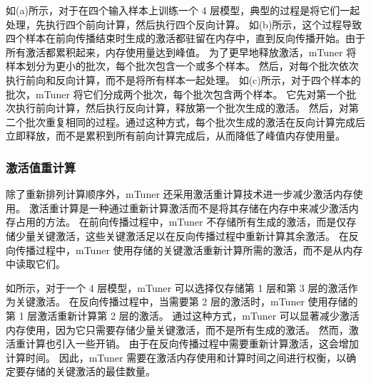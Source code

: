如(a)所示，对于在四个输入样本上训练一个 4 层模型，典型的过程是将它们一起处理，先执行四个前向计算，然后执行四个反向计算。
如(b)所示，这个过程导致四个样本在前向传播结束时生成的激活都驻留在内存中，直到反向传播开始。由于所有激活都累积起来，内存使用量达到峰值。
为了更早地释放激活，mTuner 将样本划分为更小的批次，每个批次包含一个或多个样本。
然后，对每个批次依次执行前向和反向计算，而不是将所有样本一起处理。
如(c)所示，对于四个样本的批次，mTuner 将它们分成两个批次，每个批次包含两个样本。
它先对第一个批次执行前向计算，然后执行反向计算，释放第一个批次生成的激活。
然后，对第二个批次重复相同的过程。通过这种方式，每个批次生成的激活在反向计算完成后立即释放，而不是累积到所有前向计算完成后，从而降低了峰值内存使用量。






\subsubsection{激活值重计算}
除了重新排列计算顺序外，mTuner 还采用激活重计算技术进一步减少激活内存使用。
激活重计算是一种通过重新计算激活而不是将其存储在内存中来减少激活内存占用的方法。
在前向传播过程中，mTuner 不存储所有生成的激活，而是仅存储少量关键激活，这些关键激活足以在反向传播过程中重新计算其余激活。
在反向传播过程中，mTuner 使用存储的关键激活重新计算所需的激活，而不是从内存中读取它们。

如所示，对于一个 4 层模型，mTuner 可以选择仅存储第 1 层和第 3 层的激活作为关键激活。
在反向传播过程中，当需要第 2 层的激活时，mTuner 使用存储的第 1 层激活重新计算第 2 层的激活。
通过这种方式，mTuner 可以显著减少激活内存使用，因为它只需要存储少量关键激活，而不是所有生成的激活。
然而，激活重计算也引入一些开销。
由于在反向传播过程中需要重新计算激活，这会增加计算时间。
因此，mTuner 需要在激活内存使用和计算时间之间进行权衡，以确定要存储的关键激活的最佳数量。

